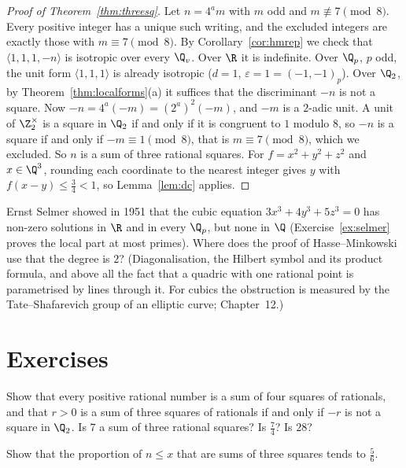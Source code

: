 \begin{proof}[Proof of Theorem~\ref{thm:threesq}]
Let $n=4^am$ with $m$ odd and $m\not\equiv7\pmod8$. Every positive integer has a unique such writing, and the excluded integers are exactly those with $m\equiv7\pmod8$. By Corollary~\ref{cor:hmrep} we check that
$\langle1,1,1,-n\rangle$ is isotropic over every $\Q_v$. Over $\R$ it is indefinite. Over $\Q_p$, $p$ odd, the unit form
$\langle1,1,1\rangle$ is already isotropic ($d=1$, $\varepsilon=1=(-1,-1)_p$). Over $\Q_2$, by Theorem~\ref{thm:localforms}(a) it
suffices that the discriminant $-n$ is not a square. Now $-n=4^a(-m)=(2^a)^2(-m)$, and $-m$ is a $2$-adic unit. A unit of $\Z_2^\times$ is a square in $\Q_2$ if and only if it is congruent to $1$ modulo $8$, so $-n$ is a square if and only if $-m\equiv1\pmod8$, that is $m\equiv7\pmod8$, which we excluded. So $n$ is a sum of three rational squares. For $f=x^2+y^2+z^2$ and $x\in\Q^3$, rounding each
coordinate to the nearest integer gives $y$ with $f(x-y)\le\frac34<1$, so Lemma~\ref{lem:dc} applies.
\end{proof}

\begin{think}
Ernst Selmer showed in 1951 that the cubic equation $3x^3+4y^3+5z^3=0$ has non-zero solutions in $\R$ and in every $\Q_p$, but
none in $\Q$ (Exercise~\ref{ex:selmer} proves the local part at most primes). Where does the proof of Hasse--Minkowski use that the
degree is $2$? (Diagonalisation, the Hilbert symbol and its product formula, and above all the fact that a quadric with one
rational point is parametrised by lines through it. For cubics the obstruction is measured by the Tate--Shafarevich group of an
elliptic curve; Chapter~12.)
\end{think}

\section{Exercises}

\begin{exercise}[$\star$]\label{ex:fourrat}
Show that every positive rational number is a sum of four squares of rationals, and that $r>0$ is a sum of three squares of
rationals if and only if $-r$ is not a square in $\Q_2$. Is $7$ a sum of three rational squares? Is $\frac7{4}$? Is $28$?
\end{exercise}

\begin{exercise}[$\star$]\label{ex:fivesixths}
Show that the proportion of $n\le x$ that are sums of three squares tends to $\frac56$.
\end{exercise}

